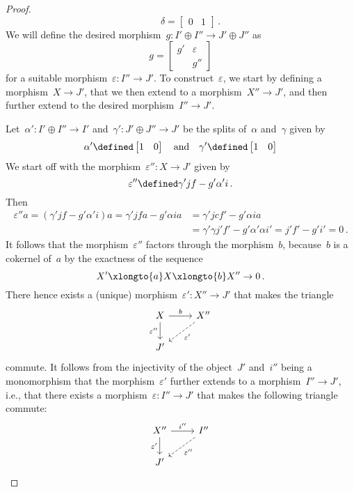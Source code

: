 \begin{proof}
\[    \qquad
    \delta
    =
    \begin{bmatrix}
      0 & 1
    \end{bmatrix} \,.
  \]
  We will define the desired morphism~$g \colon I' \oplus I'' \to J' \oplus J''$ as
  \[
    g
    =
    \begin{bmatrix}
      g'  & \varepsilon \\
          & g''
    \end{bmatrix}
  \]
  for a suitable morphism~$\varepsilon \colon I'' \to J'$.
  To construct~$\varepsilon$, we start by defining a morphism~$ X \to J'$, that we then extend to a morphism~$X'' \to J'$, and then further extend to the desired morphism~$I'' \to J'$.
  
  Let~$\alpha' \colon I' \oplus I'' \to I'$ and~$\gamma' \colon J' \oplus J'' \to J'$ be the splits of~$\alpha$ and~$\gamma$ given by
  \[
    \alpha'
    \defined
    \begin{bmatrix}
      1 & 0
    \end{bmatrix}
    \quad
    \text{and}\quad
    \gamma'
    \defined
    \begin{bmatrix}
      1 & 0
    \end{bmatrix}
  \]
  We start off with the morphism~$\varepsilon'' \colon X \to J'$ given by
  \[
    \varepsilon''
    \defined
    \gamma' j f - g' \alpha' i \,.
  \]
  Then
  \begin{align*}
    \varepsilon'' a
    =
    (\gamma' j f - g' \alpha' i) a
    =
    \gamma' j f a - g' \alpha i a
    &=
    \gamma' j c f' - g' \alpha i a  \\
    &=
    \gamma' \gamma j' f' - g' \alpha' \alpha i'
    =
    j' f' - g' i'
    =
    0 \,.
  \end{align*}
  It follows that the morphism~$\varepsilon''$ factors through the morphism~$b$, because~$b$ is a cokernel of~$a$ by the exactness of the sequence
  \[
    X'
    \xlongto{a}
    X
    \xlongto{b}
    X''
    \to
    0 \,.
  \]
  There hence exists a (unique) morphism~$\varepsilon' \colon X'' \to  J'$ that makes the triangle
  \[
    \begin{tikzcd}
        X
        \arrow{r}[above]{b}
        \arrow{d}[left]{\varepsilon''}
      & X''
        \arrow[dashed]{dl}[below right]{\varepsilon'}
      \\
        J'
      & {}
    \end{tikzcd}
  \]
  commute.
  It follows from the injectivity of the object~$J'$ and~$i''$ being a monomorphism that the morphism~$\varepsilon'$ further extends to a morphism~$I'' \to J'$, i.e., that there exists a morphism~$\varepsilon \colon I'' \to J'$ that makes the following triangle commute:
  \[
    \begin{tikzcd}
        X''
        \arrow{r}[above]{i''}
        \arrow{d}[left]{\varepsilon'}
      & I''
        \arrow[dashed]{dl}[below right]{\varepsilon''}
      \\
        J'
      & {}
    \end{tikzcd}
  \]
  

\end{proof}
